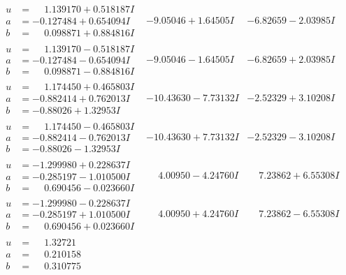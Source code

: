\documentclass[1p]{elsarticle_modified}
\theoremstyle{definition}
\begin{document}
$$\begin{array}{c|c|c}
\begin{aligned}
u &= \phantom{-}1.139170 + 0.518187 I \\
a &= -0.127484 + 0.654094 I \\
b &= \phantom{-}0.098871 + 0.884816 I\end{aligned}
 & -9.05046 + 1.64505 I & -6.82659 - 2.03985 I \\ \hline\begin{aligned}
u &= \phantom{-}1.139170 - 0.518187 I \\
a &= -0.127484 - 0.654094 I \\
b &= \phantom{-}0.098871 - 0.884816 I\end{aligned}
 & -9.05046 - 1.64505 I & -6.82659 + 2.03985 I \\ \hline\begin{aligned}
u &= \phantom{-}1.174450 + 0.465803 I \\
a &= -0.882414 + 0.762013 I \\
b &= -0.88026 + 1.32953 I\end{aligned}
 & -10.43630 - 7.73132 I & -2.52329 + 3.10208 I \\ \hline\begin{aligned}
u &= \phantom{-}1.174450 - 0.465803 I \\
a &= -0.882414 - 0.762013 I \\
b &= -0.88026 - 1.32953 I\end{aligned}
 & -10.43630 + 7.73132 I & -2.52329 - 3.10208 I \\ \hline\begin{aligned}
u &= -1.299980 + 0.228637 I \\
a &= -0.285197 - 1.010500 I \\
b &= \phantom{-}0.690456 - 0.023660 I\end{aligned}
 & \phantom{-}4.00950 - 4.24760 I & \phantom{-}7.23862 + 6.55308 I \\ \hline\begin{aligned}
u &= -1.299980 - 0.228637 I \\
a &= -0.285197 + 1.010500 I \\
b &= \phantom{-}0.690456 + 0.023660 I\end{aligned}
 & \phantom{-}4.00950 + 4.24760 I & \phantom{-}7.23862 - 6.55308 I \\ \hline\begin{aligned}
u &= \phantom{-}1.32721\phantom{ +0.000000I} \\
a &= \phantom{-}0.210158\phantom{ +0.000000I} \\
b &= \phantom{-}0.310775\phantom{ +0.000000I}\end{aligned}

\end{array}$$
\end{document}
